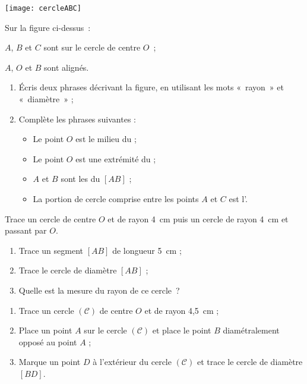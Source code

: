 \begin{exercice}[Vocabulaire]
 \begin{center} \texttt{[image: cercleABC]} \end{center}
 Sur la figure ci-dessus : 
 
$A$, $B$ et $C$ sont sur le cercle de centre $O$ ;

$A$, $O$ et $B$ sont alignés.
 \begin{enumerate}
  \item Écris deux phrases décrivant la figure, en utilisant les mots « rayon » et « diamètre » ;
  \item Complète les phrases suivantes :
   \begin{itemize}
    \item Le point $O$ est le milieu du \dotfill ;
    \item Le point $O$ est une extrémité du \dotfill ;
    \item $A$ et $B$ sont les \dotfill du \dotfill $[AB]$ ;
    \item La portion de cercle comprise entre les points $A$ et $C$ est l'\dotfill.
    \end{itemize}
  \end{enumerate}
\end{exercice}


\begin{exercice}
Trace un cercle de centre $O$ et de rayon 4 cm puis un cercle de rayon 4 cm et passant par $O$.
\end{exercice}


\begin{exercice}
 \begin{enumerate}
  \item Trace un segment $[AB]$ de longueur 5 cm ;
  \item Trace le cercle de diamètre $[AB]$ ;
  \item Quelle est la mesure du rayon de ce cercle ?
  \end{enumerate}
\end{exercice}



\begin{exercice}[Construction]
 \begin{enumerate}
  \item Trace un cercle $(\mathcal{C})$ de centre $O$ et de rayon 4,5 cm ;
  \item Place un point $A$ sur le cercle $(\mathcal{C})$ et place le point $B$ diamétralement opposé au point $A$ ;
  \item Marque un point $D$ à l'extérieur du cercle $(\mathcal{C})$ et trace le cercle de diamètre $[BD]$.
 \end{enumerate}
\end{exercice}




